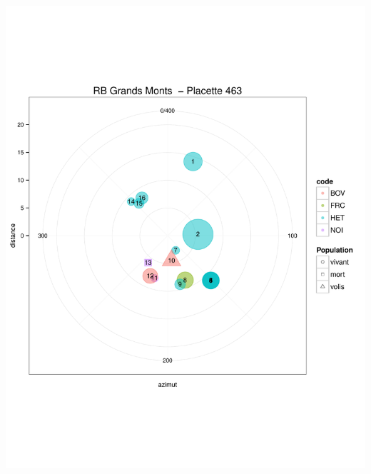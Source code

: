 \documentclass[a4paper]{book}\usepackage[]{graphicx}\usepackage[]{color}
\makeatletter
\def\maxwidth{ %
  \ifdim\Gin@nat@width>\linewidth
    \linewidth
  \else
    \Gin@nat@width
  \fi
}
\newenvironment{knitrout}{}{} %
\makeatother
\begin{document}
\begin{knitrout}
{\centering \includegraphics[width=\maxwidth]{Figures/PlanArbres-50} 

}





\end{knitrout}
\end{document}
